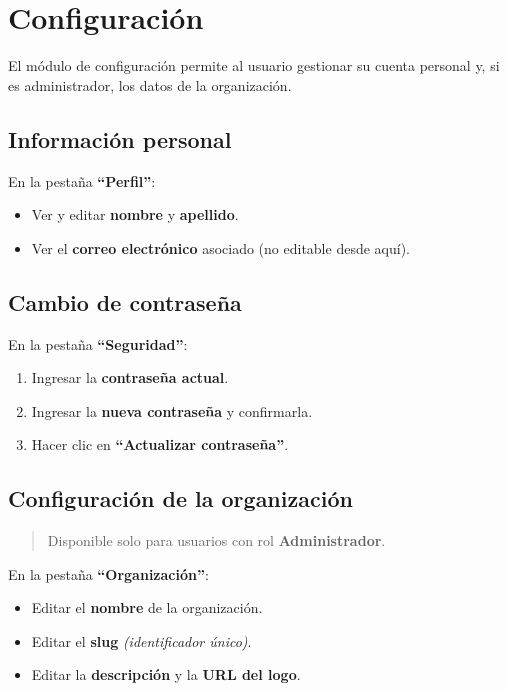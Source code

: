 \section{Configuración}\label{configuraciuxf3n}

El módulo de configuración permite al usuario gestionar su cuenta personal y, si es administrador, los datos de la organización.

\subsection{Información personal}\label{informaciuxf3n-personal}

En la pestaña \textbf{``Perfil''}:

\begin{itemize}
\tightlist
\item
  Ver y editar \textbf{nombre} y \textbf{apellido}.
\item
  Ver el \textbf{correo electrónico} asociado (no editable desde aquí).
\end{itemize}

\subsection{Cambio de contraseña}\label{cambio-de-contraseuxf1a}

En la pestaña \textbf{``Seguridad''}:

\begin{enumerate}
\def\labelenumi{\arabic{enumi}.}
\tightlist
\item
  Ingresar la \textbf{contraseña actual}.
\item
  Ingresar la \textbf{nueva contraseña} y confirmarla.
\item
  Hacer clic en \textbf{``Actualizar contraseña''}.
\end{enumerate}

\subsection{Configuración de la organización}\label{configuraciuxf3n-de-la-organizaciuxf3n}

\begin{quote}
Disponible solo para usuarios con rol \textbf{Administrador}.
\end{quote}

En la pestaña \textbf{``Organización''}:

\begin{itemize}
\tightlist
\item
  Editar el \textbf{nombre} de la organización.
\item
  Editar el \textbf{slug} \emph{(identificador único)}.
\item
  Editar la \textbf{descripción} y la \textbf{URL del logo}.
\end{itemize}


